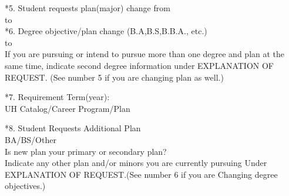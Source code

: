 \documentclass{article}
\begin{document}
\begin{Form}
\begin{multicols}{3}
\columnbreak
\parbox{0.9\columnwidth}{
    \vspace{-1.5mm}
    \CheckBox[name=majorchange, bordercolor=black]{} *5. Student requests plan(major) change from \\[1mm] \TextField[name=major1, width=3cm, bordercolor=white]{} to \TextField[name=major2, width=3cm, bordercolor=white]{}
    \vspace{1mm}\\
    \CheckBox[name=objectivechange, bordercolor=black]{} *6. Degree objective/plan change (B.A,B.S,B.B.A., etc.) \\[1mm] \TextField[name=plan1, width=2cm, bordercolor=white]{} to \TextField[name=plan2, width=2cm, bordercolor=white]{}\\
    \footnotesize If you are pursuing or intend to pursue more than one degree and plan at the same time, indicate second degree information under EXPLANATION OF REQUEST. (See number 5 if you are changing plan as well.)
    
    \CheckBox[name=term, bordercolor=black]{} *7. Requirement Term(year): \\
    UH Catalog/Career \TextField[name=catalog, width=1.5cm, bordercolor=white]{} Program/Plan \TextField[name=program, width=1.5cm, bordercolor=white]{} 
    
    \CheckBox[name=additionalplan, bordercolor=black]{} *8. Student Requests Additional Plan \\[1mm]
    \TextField[name=plan, width=2.5cm, bordercolor=white]{} BA/BS/Other\TextField[name=other, width=2.5cm, bordercolor=white]{} \\[1mm]
    Is new plan your primary or secondary plan?\\
    \scriptsize Indicate any other plan and/or minors you are currently 
    pursuing Under EXPLANATION OF REQUEST.(See number 6 if you are Changing degree objectives.)
    }


\end{multicols}
\end{Form}
\end{document}
